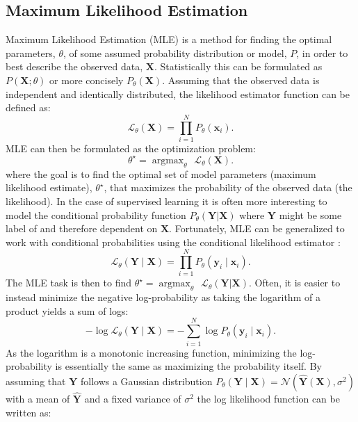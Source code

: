 \documentclass[a4paper,11pt]{article}
\DeclareMathOperator*{\argmax}{argmax} %
\begin{document}
\subsection{Maximum Likelihood Estimation} \label{sec:MLE}
Maximum Likelihood Estimation (MLE) is a method for finding the optimal parameters, $\theta$, of some assumed probability distribution or model, $P$, in order to best describe the observed data, $\mathbf{X}$. Statistically this can be formulated as $P(\mathbf{X}; \theta)$ or more concisely $P_\theta(\mathbf{X})$. Assuming that the observed data is independent and identically distributed, the likelihood estimator function can be defined as:
\begin{equation}
  \mathcal{L}_\theta(\mathbf{X}) = \prod_{i=1}^{N}{P_\theta(\mathbf{x}_i)}.
\end{equation} 
MLE can then be formulated as the optimization problem:
\begin{equation}
  \theta^\star = \argmax_{\theta} \hspace{5pt} \mathcal{L}_\theta(\mathbf{X}).
\end{equation}
where the goal is to find the optimal set of model parameters (maximum likelihood estimate), $\theta^\star$, that maximizes the probability of the observed data (the likelihood). In the case of supervised learning it is often more interesting to model the conditional probability function $P_\theta(\mathbf{Y} | \mathbf{X})$ where $\mathbf{Y}$ might be some label of and therefore dependent on $\mathbf{X}$. Fortunately, MLE can be generalized to work with conditional probabilities using the conditional likelihood estimator \cite{Goodfellow-et-al-2016}:
\begin{equation}
  \mathcal{L}_\theta(\mathbf{Y} \mid \mathbf{X}) = \prod_{i=1}^{N}{P_\theta(\mathbf{y}_i \mid \mathbf{x}_i)}.
\end{equation}
The MLE task is then to find $\theta^\star = \argmax_{\theta} \hspace{5pt} \mathcal{L}_\theta(\mathbf{Y} | \mathbf{X})$. Often, it is easier to instead minimize the negative log-probability as taking the logarithm of a product yields a sum of logs:
\begin{equation} \label{eq:negative-log-likelihood}
  -\log \mathcal{L}_{\theta}(\mathbf{Y} \mid \mathbf{X}) = -\sum_{i=1}^{N} \log P_{\theta}\left(\mathbf{y}_i \mid \mathbf{x}_i\right).
\end{equation}
As the logarithm is a monotonic increasing function, minimizing the log-probability is essentially the same as maximizing the probability itself. By assuming that $\mathbf{Y}$ follows a Gaussian distribution $P_{\theta}(\mathbf{Y} \mid \mathbf{X}) = \mathcal{N}(\hat{\mathbf{Y}}(\mathbf{X}), \sigma^2)$ with a mean of $\hat{\mathbf{Y}}$ and a fixed variance of $\sigma^2$ the log likelihood function can be written as:
\end{document}
